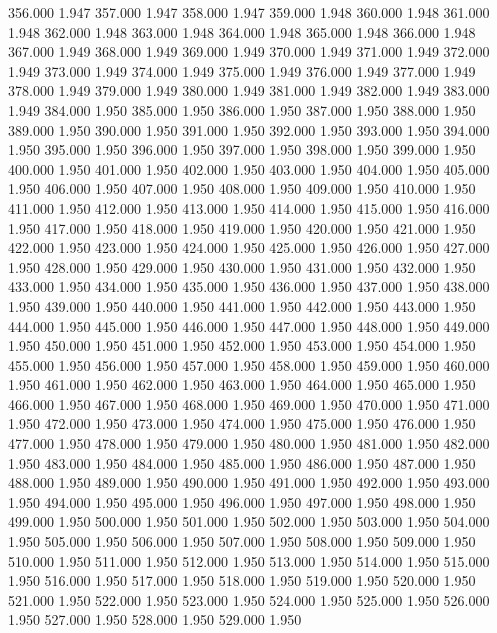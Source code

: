 356.000 1.947 
357.000 1.947 
358.000 1.947 
359.000 1.948 
360.000 1.948 
361.000 1.948 
362.000 1.948 
363.000 1.948 
364.000 1.948 
365.000 1.948 
366.000 1.948 
367.000 1.949 
368.000 1.949 
369.000 1.949 
370.000 1.949 
371.000 1.949 
372.000 1.949 
373.000 1.949 
374.000 1.949 
375.000 1.949 
376.000 1.949 
377.000 1.949 
378.000 1.949 
379.000 1.949 
380.000 1.949 
381.000 1.949 
382.000 1.949 
383.000 1.949 
384.000 1.950 
385.000 1.950 
386.000 1.950 
387.000 1.950 
388.000 1.950 
389.000 1.950 
390.000 1.950 
391.000 1.950 
392.000 1.950 
393.000 1.950 
394.000 1.950 
395.000 1.950 
396.000 1.950 
397.000 1.950 
398.000 1.950 
399.000 1.950 
400.000 1.950 
401.000 1.950 
402.000 1.950 
403.000 1.950 
404.000 1.950 
405.000 1.950 
406.000 1.950 
407.000 1.950 
408.000 1.950 
409.000 1.950 
410.000 1.950 
411.000 1.950 
412.000 1.950 
413.000 1.950 
414.000 1.950 
415.000 1.950 
416.000 1.950 
417.000 1.950 
418.000 1.950 
419.000 1.950 
420.000 1.950 
421.000 1.950 
422.000 1.950 
423.000 1.950 
424.000 1.950 
425.000 1.950 
426.000 1.950 
427.000 1.950 
428.000 1.950 
429.000 1.950 
430.000 1.950 
431.000 1.950 
432.000 1.950 
433.000 1.950 
434.000 1.950 
435.000 1.950 
436.000 1.950 
437.000 1.950 
438.000 1.950 
439.000 1.950 
440.000 1.950 
441.000 1.950 
442.000 1.950 
443.000 1.950 
444.000 1.950 
445.000 1.950 
446.000 1.950 
447.000 1.950 
448.000 1.950 
449.000 1.950 
450.000 1.950 
451.000 1.950 
452.000 1.950 
453.000 1.950 
454.000 1.950 
455.000 1.950 
456.000 1.950 
457.000 1.950 
458.000 1.950 
459.000 1.950 
460.000 1.950 
461.000 1.950 
462.000 1.950 
463.000 1.950 
464.000 1.950 
465.000 1.950 
466.000 1.950 
467.000 1.950 
468.000 1.950 
469.000 1.950 
470.000 1.950 
471.000 1.950 
472.000 1.950 
473.000 1.950 
474.000 1.950 
475.000 1.950 
476.000 1.950 
477.000 1.950 
478.000 1.950 
479.000 1.950 
480.000 1.950 
481.000 1.950 
482.000 1.950 
483.000 1.950 
484.000 1.950 
485.000 1.950 
486.000 1.950 
487.000 1.950 
488.000 1.950 
489.000 1.950 
490.000 1.950 
491.000 1.950 
492.000 1.950 
493.000 1.950 
494.000 1.950 
495.000 1.950 
496.000 1.950 
497.000 1.950 
498.000 1.950 
499.000 1.950 
500.000 1.950 
501.000 1.950 
502.000 1.950 
503.000 1.950 
504.000 1.950 
505.000 1.950 
506.000 1.950 
507.000 1.950 
508.000 1.950 
509.000 1.950 
510.000 1.950 
511.000 1.950 
512.000 1.950 
513.000 1.950 
514.000 1.950 
515.000 1.950 
516.000 1.950 
517.000 1.950 
518.000 1.950 
519.000 1.950 
520.000 1.950 
521.000 1.950 
522.000 1.950 
523.000 1.950 
524.000 1.950 
525.000 1.950 
526.000 1.950 
527.000 1.950 
528.000 1.950 
529.000 1.950 
